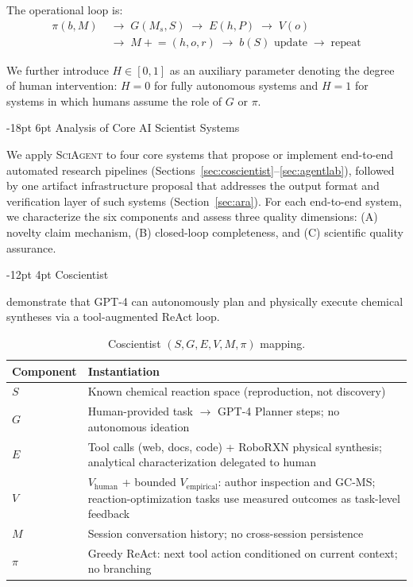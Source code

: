 \documentclass[11pt]{article}
\makeatletter
\renewcommand\section{\@startsection{section}{1}{\z@}%
  {-18pt \@plus -4pt \@minus -2pt}%
  {6pt \@plus 2pt}%
  {\normalfont\large\bfseries}}
\renewcommand\subsection{\@startsection{subsection}{2}{\z@}%
  {-12pt \@plus -2pt \@minus -2pt}%
  {4pt \@plus 1pt}%
  {\normalfont\normalsize\bfseries}}
\newcommand{\sgmvpi}{$(S, G, E, V, M, \pi)$}
\newcommand{\framework}{\textsc{SciAgent}}
\makeatother
\begin{document}
\noindent The operational loop is:
\begin{align}
  \pi(b, M) &\;\rightarrow\; G(M_s, S) \;\rightarrow\; E(h, P) \;\rightarrow\; V(o) \nonumber\\
            &\;\rightarrow\; M \mathrel{+}= (h, o, r) \;\rightarrow\; b(S) \text{ update} \;\rightarrow\; \text{repeat}
\end{align}

We further introduce $H \in [0,1]$ as an auxiliary parameter denoting the degree of human intervention: $H=0$ for fully autonomous systems and $H=1$ for systems in which humans assume the role of $G$ or $\pi$.

\section{Analysis of Core AI Scientist Systems}
\label{sec:core}

We apply \framework{} to four core systems that propose or implement end-to-end automated research pipelines (Sections~\ref{sec:coscientist}--\ref{sec:agentlab}), followed by one artifact infrastructure proposal that addresses the output format and verification layer of such systems (Section~\ref{sec:ara}). For each end-to-end system, we characterize the six components and assess three quality dimensions: (A) novelty claim mechanism, (B) closed-loop completeness, and (C) scientific quality assurance.

\subsection{Coscientist}
\label{sec:coscientist}

\citet{boiko2023emergent} demonstrate that GPT-4 can autonomously plan and physically execute chemical syntheses via a tool-augmented ReAct loop.

\begin{table}[h]
\centering
\small
\begin{tabular}{@{}lp{9cm}@{}}
\toprule
Component & Instantiation \\
\midrule
$S$ & Known chemical reaction space (reproduction, not discovery) \\
$G$ & Human-provided task $\rightarrow$ GPT-4 Planner steps; no autonomous ideation \\
$E$ & Tool calls (web, docs, code) + RoboRXN physical synthesis; analytical characterization delegated to human \\
$V$ & $V_\text{human}$ + bounded $V_\text{empirical}$: author inspection and GC-MS; reaction-optimization tasks use measured outcomes as task-level feedback \\
$M$ & Session conversation history; no cross-session persistence \\
$\pi$ & Greedy ReAct: next tool action conditioned on current context; no branching \\
\bottomrule
\end{tabular}
\caption{Coscientist \sgmvpi{} mapping.}
\end{table}
\end{document}
